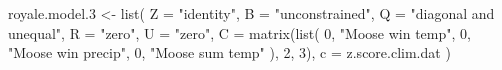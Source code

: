 \begin{Schunk}
\begin{Sinput}
 royale.model.3 <- list(
   Z = "identity", B = "unconstrained",
   Q = "diagonal and unequal", R = "zero", U = "zero",
   C = matrix(list(
     0, "Moose win temp", 0, "Moose win precip",
     0, "Moose sum temp"
   ), 2, 3),
   c = z.score.clim.dat
 )
\end{Sinput}
\end{Schunk}
